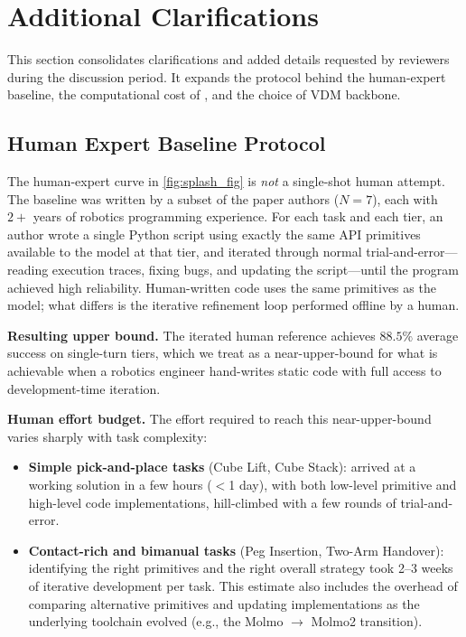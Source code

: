 \newpage
\section{Additional Clarifications}
\label{app:reviewer_revisions}
This section consolidates clarifications and added details requested by reviewers during the discussion period. It expands the protocol behind the human-expert baseline, the computational cost of \sysname{}, and the choice of VDM backbone.

\subsection{Human Expert Baseline Protocol}
\label{app:human_expert}
The human-expert curve in \cref{fig:splash_fig} is \emph{not} a single-shot human attempt. The baseline was written by a subset of the paper authors ($N{=}7$), each with $2+$ years of robotics programming experience. For each task and each tier, an author wrote a single Python script using exactly the same API primitives available to the model at that tier, and iterated through normal trial-and-error---reading execution traces, fixing bugs, and updating the script---until the program achieved high reliability. Human-written code uses the same primitives as the model; what differs is the iterative refinement loop performed offline by a human.

\textbf{Resulting upper bound.} The iterated human reference achieves $88.5\%$ average success on single-turn tiers, which we treat as a near-upper-bound for what is achievable when a robotics engineer hand-writes static code with full access to development-time iteration.

\textbf{Human effort budget.} The effort required to reach this near-upper-bound varies sharply with task complexity:
\begin{itemize}
    \item \textbf{Simple pick-and-place tasks} (Cube Lift, Cube Stack): arrived at a working solution in a few hours ($<$1 day), with both low-level primitive and high-level code implementations, hill-climbed with a few rounds of trial-and-error.
    \item \textbf{Contact-rich and bimanual tasks} (Peg Insertion, Two-Arm Handover): identifying the right primitives and the right overall strategy took 2--3 weeks of iterative development per task. This estimate also includes the overhead of comparing alternative primitives and updating implementations as the underlying toolchain evolved (e.g., the Molmo $\rightarrow$ Molmo2 transition).
\end{itemize}

